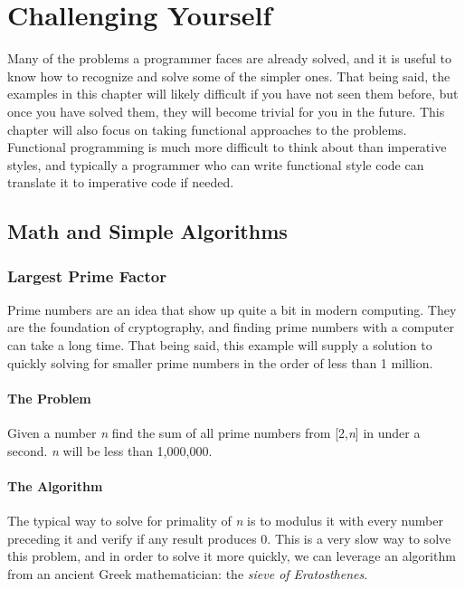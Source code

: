 \documentclass[12pt, oneside, a4paper]{book}
\begin{document}
   \chapter{Challenging Yourself}
   \label{chap:challenge}
      Many of the problems a programmer faces are already solved, and it is useful to know how to recognize and solve some of the simpler ones.
      That being said, the examples in this chapter will likely difficult if you have not seen them before, but once you have solved them, they will become trivial for you in the future.
      This chapter will also focus on taking functional approaches to the problems.
      Functional programming is much more difficult to think about than imperative styles, and typically a programmer who can write functional style code can translate it to imperative code if needed.

      \section{Math and Simple Algorithms}
         \subsection{Largest Prime Factor}
         Prime numbers are an idea that show up quite a bit in modern computing.
         They are the foundation of cryptography, and finding prime numbers with a computer can take a long time.
         That being said, this example will supply a solution to quickly solving for smaller prime numbers in the order of less than 1 million.

         \subsubsection{The Problem}
         Given a number \textit{n} find the sum of all prime numbers from [2,\textit{n}] in under a second.
         \textit{n} will be less than 1,000,000.

         \subsubsection{The Algorithm}
         The typical way to solve for primality of \textit{n} is to modulus it with every number preceding it and verify if any result produces 0.
         This is a very slow way to solve this problem, and in order to solve it more quickly, we can leverage an algorithm from an ancient Greek mathematician: the \textit{sieve of Eratosthenes}.
\end{document}

